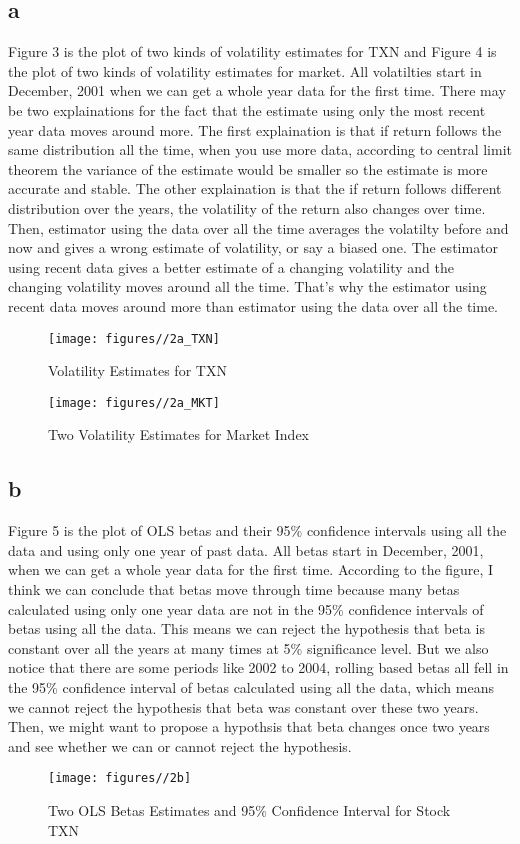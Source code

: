 \documentclass{report}
\begin{document}
\subsection{a}
Figure 3 is the plot of two kinds of volatility estimates for TXN and Figure 4 is the plot of two kinds of volatility estimates for market. All volatilties start in December, 2001 when we can get a whole year data for the first time. There may be two explainations for the fact that the estimate using only the most recent year data moves around more. The first explaination is that if return follows the same distribution all the time, when you use more data, according to central limit theorem the variance of the estimate would be smaller so the estimate is more accurate and stable. The other explaination is that the if return follows different distribution over the years, the volatility of the return also changes over time. Then, estimator using the data over all the time averages the volatilty before and now and gives a wrong estimate of volatility, or say a biased one. The estimator using recent data gives a better estimate of a changing volatility and the changing volatility moves around all the time. That's why the estimator using recent data moves around more than estimator using the data over all the time.
\begin{figure}[H]
        \centering 
         \texttt{[image: figures//2a\_TXN]}
         \caption{ Volatility Estimates for TXN}
\end{figure}
\begin{figure}[H]
        \centering 
         \texttt{[image: figures//2a\_MKT]}
         \caption{ Two Volatility Estimates for Market Index}
\end{figure}
\subsection{b}
Figure 5 is the plot of OLS betas and their 95\% confidence intervals using all the data and using only one year of past data. All betas start in December, 2001, when we can get a whole year data for the first time. According to the figure, I  think we can conclude that betas move through time because many betas calculated using only one year data are not in the 95\% confidence intervals of betas using all the data. This means we can reject the hypothesis that beta is constant over all the years at many times at 5\% significance level. But we also notice that there are some periods like 2002 to 2004, rolling based betas all fell in the 95\% confidence interval of betas calculated using all the data, which means we cannot reject the hypothesis that beta was constant over these two years. Then, we might want to propose a hypothsis that beta changes once two years and see whether we can or cannot reject the hypothesis.
\begin{figure}[H]
        \centering 
         \texttt{[image: figures//2b]}
         \caption{ Two OLS Betas Estimates and 95\% Confidence Interval for Stock TXN}
\end{figure}
\end{document}
